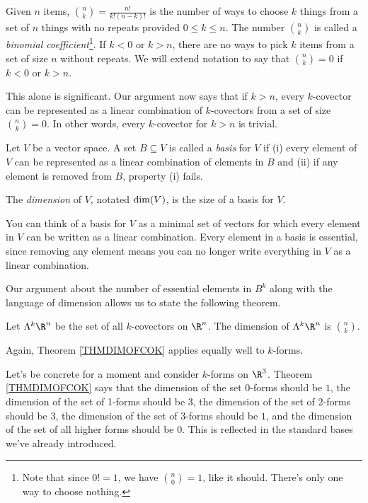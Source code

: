 Given $n$ items, $\binom{n}{k}=\frac{n!}{k!(n-k)!}$ is the number of ways to choose
$k$ things from a set of $n$ things with no repeats provided $0\leq k\leq n$.  The
number $\binom{n}{k}$ is called a \emph{binomial coefficient}\footnote{
Note that since $0!=1$, we have $\binom{n}{0} = 1$, like it should.  There's only
one way to choose nothing.
}.  If $k<0$ or $k>n$, there are no ways to pick $k$ items from a set
of size $n$ without repeats.  We will extend notation to say that $\binom{n}{k}=0$ if
$k<0$ or $k>n$.

This alone is significant.  Our argument now says that if $k>n$, every
$k$-covector can be represented as a linear combination of $k$-covectors
from a set of size $\binom{n}{k}=0$.  In other words, every $k$-covector for $k>n$
is trivial.

\begin{definition}
	Let $V$ be a vector space.
	A set $B\subseteq V$ is called a \emph{basis} for $V$
	if (i) every element of $V$ can be represented as a linear combination
	of elements in $B$ and (ii) if any element is removed from $B$, property (i)
	fails.

	The \emph{dimension} of $V$, notated $\operatorname{dim}(V)$, is the size of a basis for
	$V$.
\end{definition}
You can think of a basis for $V$ as a minimal set of vectors for which every element
in $V$ can be written as a linear combination.  Every element in a basis is essential,
since removing any element means you can no longer write everything in $V$ as a 
linear combination.

Our argument about the number of essential elements in $B^k$ along with the language
of dimension allows us to state the following theorem.

\begin{theorem}
	\label{THMDIMOFCOK}
	Let $\Lambda^k\R^n$ be the set of all $k$-covectors on $\R^n$.
	The dimension of $\Lambda^k\R^n$ is $\binom{n}{k}$.
\end{theorem}
Again, Theorem \ref{THMDIMOFCOK} applies equally well to $k$-forms.

Let's be concrete for a moment and consider $k$-forms on $\R^3$.  Theorem \ref{THMDIMOFCOK}
says that the dimension of the set 0-forms should be $1$, the dimension of the
set of 1-forms should be $3$, the dimension of the set of 2-forms should be $3$,
the dimension of the set of 3-forms should be $1$, and the dimension of the set
of all higher forms should be $0$.  This is reflected in the standard bases we've 
already introduced.

